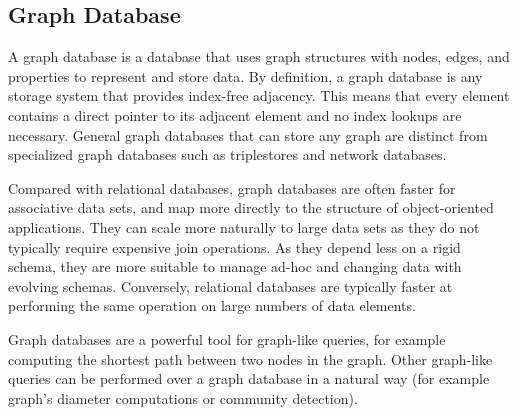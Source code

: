 \subsection{Graph Database}
A graph database is a database that uses graph structures with nodes, edges, and properties to represent and store data. By definition, a graph database is any storage system that provides index-free adjacency. This means that every element contains a direct pointer to its adjacent element and no index lookups are necessary. General graph databases that can store any graph are distinct from specialized graph databases such as triplestores and network databases.

Compared with relational databases, graph databases are often faster for associative data sets, and map more directly to the structure of object-oriented applications. They can scale more naturally to large data sets as they do not typically require expensive join operations. As they depend less on a rigid schema, they are more suitable to manage ad-hoc and changing data with evolving schemas. Conversely, relational databases are typically faster at performing the same operation on large numbers of data elements.

Graph databases are a powerful tool for graph-like queries, for example computing the shortest path between two nodes in the graph. Other graph-like queries can be performed over a graph database in a natural way (for example graph's diameter computations or community detection).

